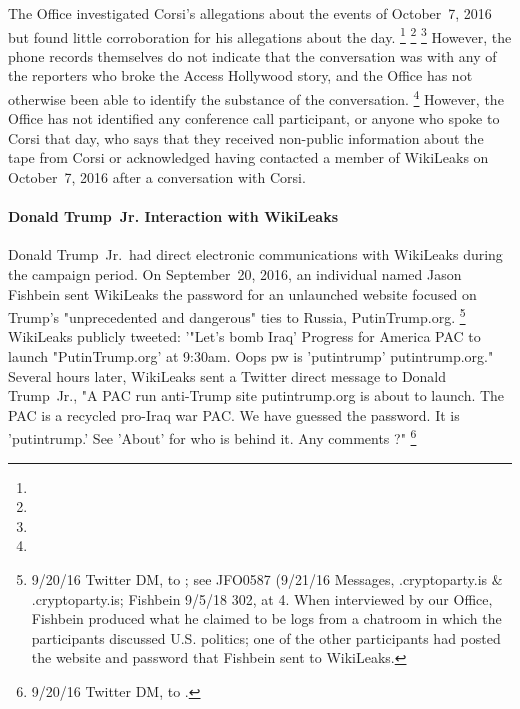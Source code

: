 The Office investigated Corsi's allegations about the events of October~7, 2016 but found little corroboration for his allegations about the day.%
\footnote{ }
\footnote{}
\footnote{  }
However, the phone records themselves do not indicate that the conversation was with any of the reporters who broke the Access Hollywood story, and the Office has not otherwise been able to identify the substance of the conversation.
\footnote{    }
However, the Office has not identified any conference call participant, or anyone who spoke to Corsi that day, who says that they received non-public information about the tape from Corsi or acknowledged having contacted a member of WikiLeaks on October~7, 2016 after a conversation with Corsi.

\paragraph{Donald Trump~Jr. Interaction with WikiLeaks}

Donald Trump~Jr.\ had direct electronic communications with WikiLeaks during the campaign period.
On September~20, 2016, an individual named Jason Fishbein sent WikiLeaks the password for an unlaunched website focused on Trump's "unprecedented and dangerous" ties to Russia, PutinTrump.org.%
\footnote{9/20/16 Twitter DM, \@JasonFishbein to \@WikiLeaks;
see JFO0587 (9/21/16 Messages, \@jabber.cryptoparty.is \& \@jabber.cryptoparty.is;
Fishbein 9/5/18 302, at 4.
When interviewed by our Office, Fishbein produced what he claimed to be logs from a chatroom in which the participants discussed U.S. politics;
one of the other participants had posted the website and password that Fishbein sent to WikiLeaks.}
WikiLeaks publicly tweeted: '"Let's bomb Iraq'
Progress for America PAC to launch "PutinTrump.org' at 9:30am. Oops pw is 'putintrump' putintrump.org."
Several hours later, WikiLeaks sent a Twitter direct message to Donald Trump~Jr., "A PAC run anti-Trump site putintrump.org is about to launch.
The PAC is a recycled pro-Iraq war PAC\null.
We have guessed the password.
It is 'putintrump.'
See 'About' for who is behind it.
Any comments ?"%
\footnote{9/20/16 Twitter DM, \@WikiLeaks to \@DonaldJTrumpJr.}

